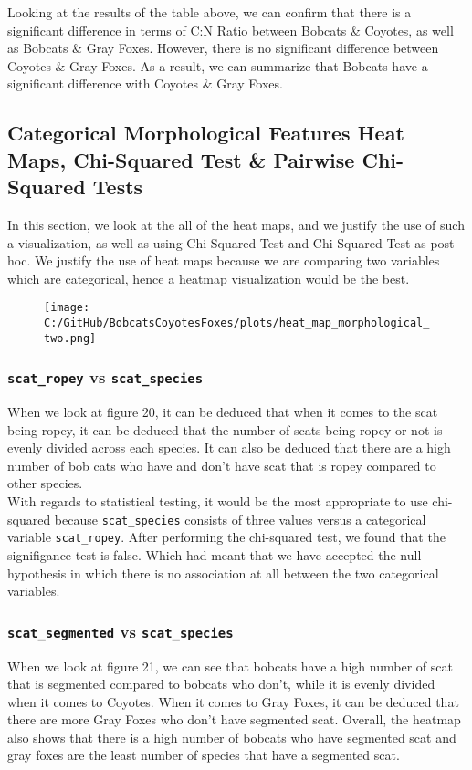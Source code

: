 \documentclass[a4paper]{article}
\begin{document}
\noindent Looking at the results of the table above, we can confirm that there is a significant difference in terms of C:N Ratio between Bobcats \& Coyotes,
as well as Bobcats \& Gray Foxes. However, there is no significant difference between Coyotes \& Gray Foxes. As a result, we can summarize that Bobcats have
a significant difference with Coyotes \& Gray Foxes.

\newpage

\subsection{Categorical Morphological Features Heat Maps, Chi-Squared Test \&  Pairwise Chi-Squared Tests}
In this section, we look at the all of the heat maps, and we justify the use of such a visualization, as well as using Chi-Squared Test and Chi-Squared Test
as post-hoc. We justify the use of heat maps because we are comparing two variables which are categorical, hence a heatmap visualization would be the best.
\vspace{0.5cm}
\begin{figure}[h]
    \centering
    \texttt{[image: C:/GitHub/BobcatsCoyotesFoxes/plots/heat\_map\_morphological\_two.png]} 
\end{figure}

\subsubsection{\texttt{scat\_ropey} vs \texttt{scat\_species}}
When we look at figure 20, it can be deduced that when it comes to the scat being ropey, it can be deduced that the number of scats being ropey or not is
evenly divided across each species. It can also be deduced that there are a high number of bob cats who have and don't have scat that is ropey compared to
other species. \\

\noindent With regards to statistical testing, it would be the most appropriate to use chi-squared because \texttt{scat\_species} consists of three values
versus a categorical variable \texttt{scat\_ropey}. After performing the chi-squared test, we found that the signifigance test is false. Which had meant that
we have accepted the null hypothesis in which there is no association at all between the two categorical variables. \\

\subsubsection{\texttt{scat\_segmented} vs \texttt{scat\_species}}
When we look at figure 21, we can see that bobcats have a high number of scat that is segmented compared to bobcats who don't, while it is evenly divided when
it comes to Coyotes. When it comes to Gray Foxes, it can be deduced that there are more Gray Foxes who don't have segmented scat. Overall, the heatmap also
shows that there is a high number of bobcats who have segmented scat and gray foxes are the least number of species that have a segmented scat. \\
\end{document}
